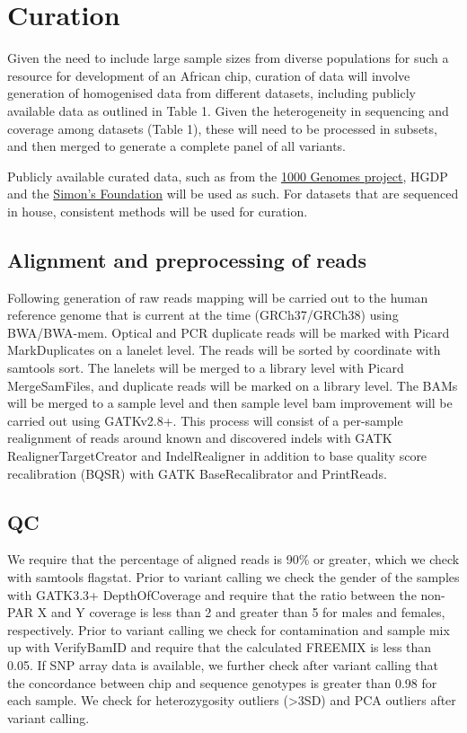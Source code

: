 \section{Curation}
Given the need to include large sample sizes from diverse populations for such a resource for development of an African chip, curation of data will involve generation of homogenised data from different datasets, including publicly available data as outlined in Table 1. Given the heterogeneity in sequencing and coverage among datasets (Table 1), these will need to be processed in subsets, and then merged to generate a complete panel of all variants. 

Publicly available curated data, such as from the \href{http://www.1000genomes.org}{1000 Genomes project}, HGDP and the \href{http://www.simonsfoundation.org/}{Simon’s Foundation} will be used as such. For datasets that are sequenced in house, consistent methods will be used for curation.

\subsection{Alignment and preprocessing of reads}
Following generation of raw reads mapping will be carried out to the human reference genome that is current at the time (GRCh37/GRCh38) using BWA/BWA-mem. Optical and PCR duplicate reads will be marked with Picard MarkDuplicates on a lanelet level. The reads will be sorted by coordinate with samtools sort. The lanelets will be merged to a library level with Picard MergeSamFiles, and duplicate reads will be marked on a library level. The BAMs will be merged to a sample level and then sample level bam improvement will be carried out using GATKv2.8+. This process will consist of a per-sample realignment of reads around known and discovered indels with GATK RealignerTargetCreator and IndelRealigner in addition to base quality score recalibration (BQSR) with GATK BaseRecalibrator and PrintReads.

\subsection{QC}
We require that the percentage of aligned reads is 90\% or greater, which we check with samtools flagstat. Prior to variant calling we check the gender of the samples with GATK3.3+ DepthOfCoverage and require that the ratio between the non-PAR X and Y coverage is less than 2 and greater than 5 for males and females, respectively. Prior to variant calling we check for contamination and sample mix up with VerifyBamID and require that the calculated FREEMIX is less than 0.05. If SNP array data is available, we further check after variant calling that the concordance between chip and sequence genotypes is greater than 0.98 for each sample. We check for heterozygosity outliers (\textgreater3SD) and PCA outliers after variant calling.

